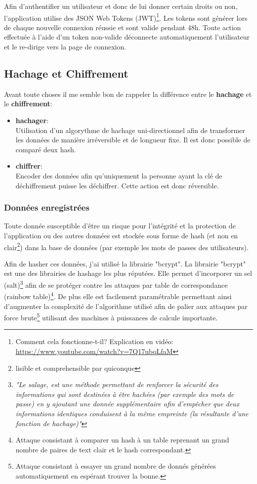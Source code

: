Afin d'authentifier un utilisateur et donc de lui donner certain droits ou non, l'application utilise des JSON Web Tokens (JWT)\footnote{Comment cela fonctionne-t-il? Explication en vidéo: \url{https://www.youtube.com/watch?v=7Q17ubqLfaM}}. Les tokens sont générer lors de chaque nouvelle connexion réussie et sont valide pendant 48h. Toute action effectuée à l'aide d'un token non-valide déconnecte automatiquement l'utilisateur et le re-dirige vers la page de connexion. 

\newpage

\subsection{Hachage et Chiffrement}

Avant toute choses il me semble bon de rappeler la différence entre le \textbf{hachage} et le \textbf{chiffrement}: 
\begin{itemize}
  \item \textbf{hachager}: \\ Utilisation d'un algorythme de hachage uni-directionnel afin de transformer les données de manière irréversible et de longueur fixe. Il est donc possible de comparé deux hash.
  \item \textbf{chiffrer}: \\ Encoder des données afin qu'uniquement la personne ayant la clé de déchiffrement puisse les déchiffrer. Cette action est donc réversible.
\end{itemize}

\subsubsection{Données enregistrées}
Toute donnée susceptible d'être un risque pour l'intégrité et la protection de l'application ou des autres données est stockée sous forme de hash (et non en clair\footnote{lisible et comprehensible par quiconque}) dans la base de données (par exemple les mots de passes des utilisateurs). 

\newpara

Afin de hasher ces données, j'ai utilisé la librairie "bcrypt". La librairie "bcrypt" est une des librairies de hashage les plus réputées. Elle permet d'incorporer un sel (salt)\footnote{\textit{"Le salage, est une méthode permettant de renforcer la sécurité des informations qui sont destinées à être hachées (par exemple des mots de passe) en y ajoutant une donnée supplémentaire afin d’empêcher que deux informations identiques conduisent à la même empreinte (la résultante d’une fonction de hachage)"}\cite{Salt}} afin de se protéger contre les attaques par table de correspondance (rainbow table)\footnote{Attaque consistant à comparer un hash à un table reprenant un grand nombre de paires de text clair et le hash correspondant.}. De plus elle est facilement paramétrable permettant ainsi d'augmenter la complexité de l'algorithme utilisé afin de palier aux attaques par force brute\footnote{Attaque consistant à essayer un grand nombre de donnés générées automatiquement en espérant trouver la bonne.} utilisant des machines à puissances de calcule importante. 

